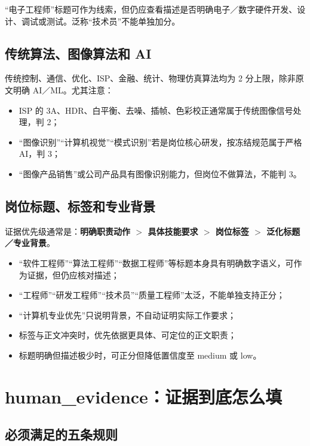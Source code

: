 \documentclass[11pt,a4paper,fontset=none]{ctexart}
\begin{document}
“电子工程师”标题可作为线索，但仍应查看描述是否明确电子／数字硬件开发、设计、调试或测试。泛称“技术员”不能单独加分。

\subsection{传统算法、图像算法和 AI}

传统控制、通信、优化、ISP、金融、统计、物理仿真算法均为 2 分上限，除非原文明确 AI／ML。尤其注意：

\begin{itemize}
  \item ISP 的 3A、HDR、白平衡、去噪、插帧、色彩校正通常属于传统图像信号处理，判 2；
  \item “图像识别”“计算机视觉”“模式识别”若是岗位核心研发，按冻结规范属于严格 AI，判 3；
  \item “图像产品销售”或公司产品具有图像识别能力，但岗位不做算法，不能判 3。
\end{itemize}

\subsection{岗位标题、标签和专业背景}

证据优先级通常是：\textbf{明确职责动作 $>$ 具体技能要求 $>$ 岗位标签 $>$ 泛化标题／专业背景}。

\begin{itemize}
  \item “软件工程师”“算法工程师”“数据工程师”等标题本身具有明确数字语义，可作为证据，但仍应核对描述；
  \item “工程师”“研发工程师”“技术员”“质量工程师”太泛，不能单独支持正分；
  \item “计算机专业优先”只说明背景，不自动证明实际工作要求；
  \item 标签与正文冲突时，优先依据更具体、可定位的正文职责；
  \item 标题明确但描述极少时，可正分但降低置信度至 medium 或 low。
\end{itemize}

\section{human\_evidence：证据到底怎么填}

\subsection{必须满足的五条规则}
\end{document}

